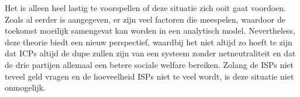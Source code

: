 Het is alleen heel lastig te voorspellen of deze situatie zich ooit gaat voordoen. Zoals al eerder is aangegeven, er zijn veel factoren die meespelen, waardoor de toekomst moeilijk samengevat kan worden in een analytisch model. Nevertheless, deze theorie biedt een nieuw perspectief, waardbij het niet altijd zo hoeft te zijn dat \acp{ICP} altijd de dupe zullen zijn van een systeem zonder netneutraliteit en dat de drie partijen allemaal een betere sociale welfare bereiken. Zolang de \acp{ISP} niet teveel geld vragen en de hoeveelheid \acp{ISP} niet te veel wordt, is deze situatie niet onmogelijk.